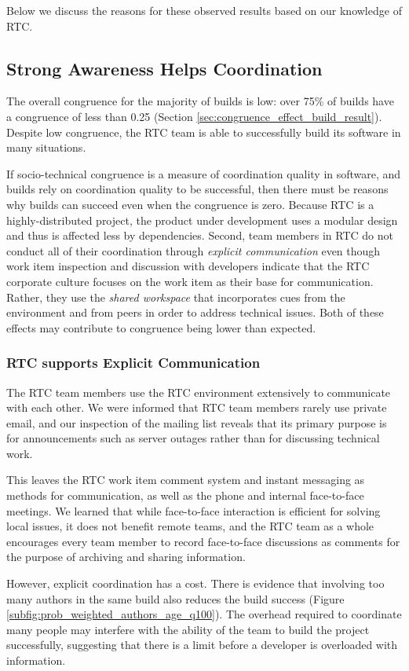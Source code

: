 Below we discuss the reasons for these observed results based on our knowledge of RTC.

\subsection{Strong Awareness Helps Coordination}
The overall congruence for the majority of builds is low: over 75\% of
builds have a congruence of less than 0.25 (Section \ref{sec:congruence_effect_build_result}).
Despite low congruence, the RTC team is able to successfully build its software in many situations.


If socio-technical congruence is a measure of coordination quality in software, and builds rely on coordination quality to be successful, then there must be reasons why builds can succeed even when the congruence is zero.
Because RTC is a highly-distributed project, the product under development uses a modular design \cite{maccormack2006} and thus is affected less by dependencies. Second, team members in RTC do not conduct all of their coordination through \emph{explicit communication} even though work item inspection and discussion with developers indicate that the RTC corporate culture focuses on the work item as their base for communication. Rather, they use the \emph{shared workspace} that incorporates cues from the environment and from peers in order to address technical issues. Both of these effects may contribute to congruence being lower than expected.

\subsubsection{RTC supports Explicit Communication}
The RTC team members use the RTC environment extensively to communicate with each other. We were informed that RTC team members rarely use private email, and our inspection of the mailing list reveals that its primary purpose is for announcements such as server outages rather than for discussing technical work.

This leaves the RTC work item comment system and instant messaging as methods for communication, as well as the phone and internal face-to-face meetings.
We learned that while face-to-face interaction is efficient for solving local issues, it does not benefit remote teams, and the RTC team as a whole encourages every team member to record face-to-face discussions as comments for the purpose of archiving and sharing information.

However, explicit coordination has a cost. There is evidence that involving too many authors in the same build also reduces the build success (Figure \ref{subfig:prob_weighted_authors_age_q100}). The overhead required to coordinate many people may interfere with the ability of the team to build the project successfully, suggesting that there is a limit before a developer is overloaded with information.

